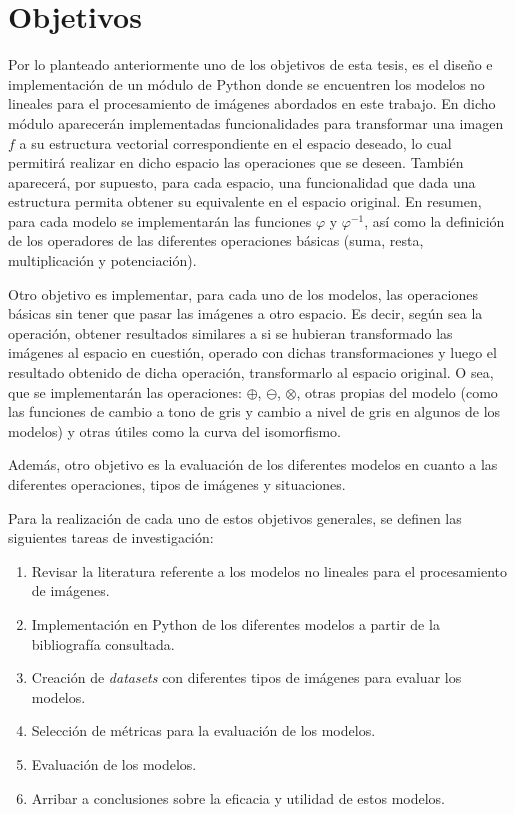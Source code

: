 \section*{Objetivos}

Por lo planteado anteriormente uno de los objetivos de esta tesis, es el dise\~no e implementaci\'on de un m\'odulo de Python donde se encuentren los modelos no lineales para el procesamiento de im\'agenes abordados en este trabajo. En dicho m\'odulo aparecer\'an implementadas funcionalidades para transformar una imagen $f$ a su estructura vectorial correspondiente en el espacio deseado, lo cual permitir\'a realizar en dicho espacio las operaciones que se deseen. Tambi\'en aparecer\'a, por supuesto, para cada espacio, una funcionalidad que dada una estructura permita obtener su equivalente en el espacio original. En resumen, para cada modelo se implementar\'an las funciones $\varphi$ y $\varphi^{-1}$, as\'i como la definici\'on de los operadores de las diferentes operaciones b\'asicas (suma, resta, multiplicaci\'on y potenciaci\'on).

Otro objetivo es implementar, para cada uno de los modelos, las operaciones b\'asicas sin tener que pasar las im\'agenes a otro espacio. Es decir, seg\'un sea la operaci\'on, obtener resultados similares a si se hubieran transformado las im\'agenes al espacio en cuesti\'on, operado con dichas transformaciones y luego el resultado obtenido de dicha operaci\'on, transformarlo al espacio original. O sea, que se implementar\'an las operaciones: $\oplus$, $\ominus$, $\otimes$, otras propias del modelo (como las funciones de cambio a tono de gris y cambio a nivel de gris en algunos de los modelos) y otras \'utiles como la curva del isomorfismo.

Adem\'as, otro objetivo es la evaluaci\'on de los diferentes modelos en cuanto a las diferentes operaciones, tipos de im\'agenes y situaciones.

Para la realizaci\'on de cada uno de estos objetivos generales, se definen las siguientes tareas de investigaci\'on:

\begin{enumerate}
	\item Revisar la literatura referente a los modelos no lineales para el procesamiento de im\'agenes.
	\item Implementaci\'on en Python de los diferentes modelos a partir de la bibliograf\'ia consultada.
	\item Creaci\'on de \textit{datasets} con diferentes tipos de im\'agenes para evaluar los modelos.
	\item Selecci\'on de m\'etricas para la evaluaci\'on de los modelos.
	\item Evaluaci\'on de los modelos.
	\item Arribar a conclusiones sobre la eficacia y utilidad de estos modelos. 
\end{enumerate}

